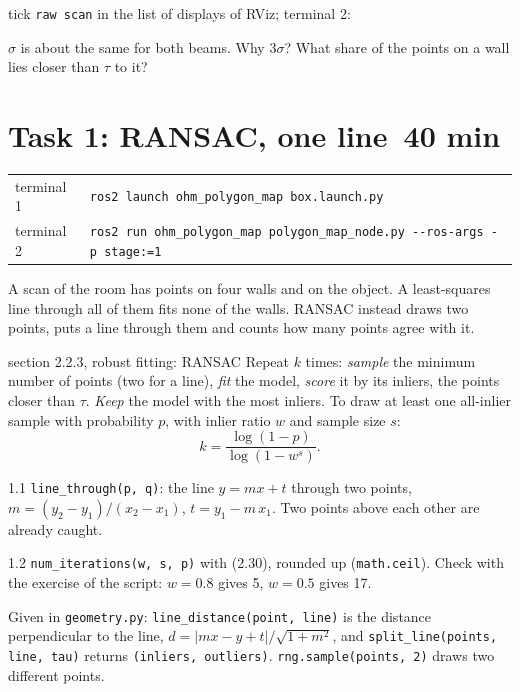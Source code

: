 \documentclass[11pt,a4paper,parskip=half]{scrartcl}
\makeatletter
\newcommand{\thema}[1]{\texttt{#1}}
\newcommand{\datei}[1]{\texttt{#1}}
\newcommand{\minutes}[1]{\hfill{\normalsize\mdseries\color{ohmgrey}\faClock[regular]~#1 min}}
\newcommand{\running}[2]{\begin{tcolorbox}[base, colback=black!3, borderline west={2.5pt}{0pt}{ohmgrey},
        title={\faTerminal~Running}, coltitle=ohmgrey, colbacktitle=black!3, fonttitle=\small\bfseries,
        toptitle=2pt, bottomtitle=0pt, fontupper=\small]
  \begin{tabularx}{\linewidth}{@{}>{\color{ohmgrey}}l >{\raggedright\arraybackslash}X@{}}
    terminal 1 & \texttt{ros2 launch ohm\_polygon\_map box.launch.py#1} \\
    terminal 2 & \texttt{ros2 run ohm\_polygon\_map polygon\_map\_node.py -\kern0pt-ros-args #2}
  \end{tabularx}
\end{tcolorbox}}
\newcommand{\expected}[2][]{\begin{seebox}
  \begin{minipage}[c]{0.36\linewidth}\resizebox{\linewidth}{!}{}\end{minipage}%
  \hfill
  \begin{minipage}[c]{0.615\linewidth}
    {\footnotesize\color{ohmgrey}#1terminal 2:}
    
  \end{minipage}
\end{seebox}}
\makeatother
\begin{document}
\expected[tick \thema{raw scan} in the list of displays of RViz; ]{stage0}

\begin{checkpoint}
\(\sigma\) is about the same for both beams. Why \(3\sigma\)? What share of the points on a wall lies
closer than \(\tau\) to it?
\end{checkpoint}

\newpage
\section{Task 1: RANSAC, one line\minutes{40}}
\label{sec:task1}
\running{}{-p stage:=1}

A scan of the room has points on four walls and on the object. A least-squares line through all of them
fits none of the walls. RANSAC instead draws two points, puts a line through them and counts how many
points agree with it.

\begin{script}{section 2.2.3, robust fitting: RANSAC}
Repeat \(k\) times: \emph{sample} the minimum number of points (two for a line), \emph{fit} the model,
\emph{score} it by its inliers, the points closer than \(\tau\). \emph{Keep} the model with the most
inliers. To draw at least one all-inlier sample with probability \(p\), with inlier ratio \(w\) and sample
size \(s\):
\begin{equation}
  k = \frac{\log(1 - p)}{\log\left(1 - w^s\right)} .
  \tag{2.30}
\end{equation}
\end{script}

\begin{todo}{1.1}
\thema{line\_through(p, q)}: the line \(y = m x + t\) through two points,
\(m = (y_2 - y_1)/(x_2 - x_1)\), \(t = y_1 - m\,x_1\). Two points above each other are already caught.
\end{todo}

\begin{todo}{1.2}
\thema{num\_iterations(w, s, p)} with (2.30), rounded up (\thema{math.ceil}). Check with the exercise of
the script: \(w = 0.8\) gives 5, \(w = 0.5\) gives 17.
\end{todo}

\begin{note}
Given in \datei{geometry.py}: \thema{line\_distance(point, line)} is the distance perpendicular to the line,
\(d = |m x - y + t| / \sqrt{1 + m^2}\), and \thema{split\_line(points, line, tau)} returns
\thema{(inliers, outliers)}. \thema{rng.sample(points, 2)} draws two different points.
\end{note}
\end{document}
